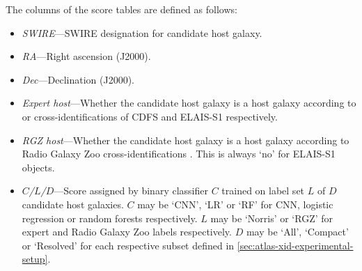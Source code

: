   The columns of the score tables are defined as follows:
  \begin{itemize}
    \item \emph{SWIRE}---SWIRE designation for candidate host galaxy.
    \item \emph{RA}---Right ascension (J2000).
    \item \emph{Dec}---Declination (J2000).
    \item \emph{Expert host}---Whether the candidate host galaxy is a host galaxy according to \citet{norris06} or \citet{middelberg08} cross-identifications of CDFS and ELAIS-S1 respectively.
    \item \emph{RGZ host}---Whether the candidate host galaxy is a host galaxy according to Radio Galaxy Zoo cross-identifications \citep{wong21rgz}. This is always `no' for ELAIS-S1 objects.
    \item \emph{$C$/$L$/$D$}---Score assigned by binary classifier $C$ trained on label set $L$ of $D$ candidate host galaxies. $C$ may be `CNN', `LR' or `RF' for CNN, logistic regression or random forests respectively. $L$ may be `Norris' or `RGZ' for expert and Radio Galaxy Zoo labels respectively. $D$ may be `All', `Compact' or `Resolved' for each respective subset defined in \autoref{sec:atlas-xid-experimental-setup}.
  \end{itemize}

